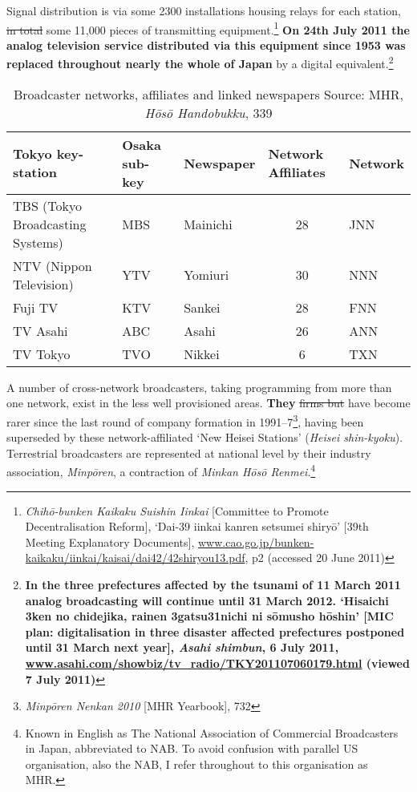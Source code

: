 \documentclass[11pt, oneside, a4paper, headsepline]{scrartcl}
\begin{document}
Signal distribution is via some 2300 installations housing relays for each station, \st{in total }some 11,000 pieces of transmitting equipment.\footnote{\emph{Chih\={o}-bunken Kaikaku Suishin Iinkai} [Committee to Promote Decentralisation Reform], `Dai-39 iinkai kanren setsumei shiry\={o}' [39th Meeting Explanatory Documents], \url{www.cao.go.jp/bunken-kaikaku/iinkai/kaisai/dai42/42shiryou13.pdf}, p2 (accessed 20 June 2011)} {\bf On 24th July 2011 the analog television service distributed via this equipment since 1953 was replaced throughout nearly the whole of Japan} by a digital equivalent.\footnote{\bf In the three prefectures affected by the tsunami of 11 March 2011 analog broadcasting will continue until 31 March 2012. `Hisaichi 3ken no chidejika, rainen 3gatsu31nichi ni sōmusho hōshin' [MIC plan: digitalisation in three disaster affected prefectures postponed until 31 March next year], \emph{Asahi shimbun}, 6 July 2011, \url{www.asahi.com/showbiz/tv_radio/TKY201107060179.html} (viewed 7 July 2011)} %

\begin{table}[t]%
\footnotesize
\begin{center}
\begin{tabular}{lllcl}
\toprule
Tokyo key-station & Osaka sub-key & Newspaper & \multicolumn{1}{l}{Network Affiliates} & Network \\ 
\midrule
TBS (Tokyo Broadcasting Systems) & MBS & Mainichi & 28 & JNN \\ 
NTV (Nippon Television) & YTV & Yomiuri & 30 & NNN \\ 
Fuji TV& KTV & Sankei & 28 & FNN \\ 
TV Asahi & ABC & Asahi & 26 & ANN \\ 
TV Tokyo & TVO & Nikkei & 6 & TXN \\ 
\bottomrule
\end{tabular}
\caption{Broadcaster networks, affiliates and linked newspapers \newline \footnotesize Source: MHR, \textit{H\={o}s\={o} Handobukku}, 339\label{tab:networks}}
\end{center}
\end{table}

A number of cross-network broadcasters, taking programming from more than one network, exist in the less well provisioned areas. \textbf{They} \st{firms but} have become rarer since the last round of company formation in 1991--7\footnote{\textit{Minp\={o}ren Nenkan 2010} [MHR Yearbook], 732}, having been superseded by these network-affiliated `New Heisei Stations' (\textit{Heisei shin-kyoku}). Terrestrial broadcasters are represented at national level by their industry association, \textit{Minp\={o}ren}, a contraction of \textit{Minkan H\={o}s\={o} Renmei}.\footnote{Known in English as The National Association of Commercial Broadcasters in Japan, abbreviated to NAB. To avoid confusion with parallel US organisation, also the NAB, I refer throughout to this organisation as MHR.}
\end{document}
